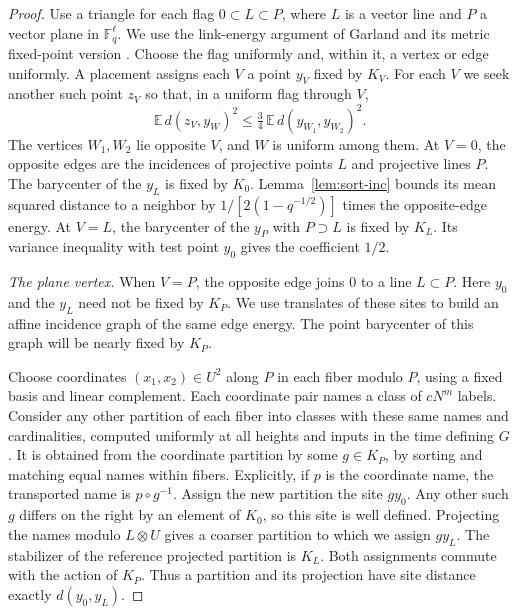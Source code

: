 \begin{proof}
Use a triangle for each flag $0\subset L\subset P$, where $L$ is
a vector line and $P$ a vector plane in $\mathbb F_q^\ell$. We use
the link-energy argument of Garland and its metric fixed-point
version \cite{garland,izekinayatani}. Choose the flag uniformly and,
within it, a vertex or edge uniformly. A placement assigns each $V$
a point $y_V$ fixed by $K_V$. For each $V$ we seek another such point
$z_V$ so that, in a uniform flag through $V$,
\begin{equation}\label{eq:sort-flag-link}
 \mathbb E\,d(z_V,y_W)^2\le \tfrac34\,
                           \mathbb E\,d(y_{W_1},y_{W_2})^2 .
\end{equation}
The vertices $W_1,W_2$ lie opposite $V$, and $W$ is uniform among them.
At $V=0$, the opposite edges are the incidences of projective points
$L$ and projective lines $P$. The barycenter of the $y_L$ is fixed
by $K_0$. Lemma~\ref{lem:sort-inc} bounds its mean squared distance
to a neighbor by $1/[2(1-q^{-1/2})]$ times the opposite-edge energy.
At $V=L$, the barycenter of the $y_P$ with $P\supset L$ is fixed by
$K_L$. Its variance inequality with test point $y_0$ gives the
coefficient $1/2$.

\smallskip\noindent
\emph{The plane vertex.}
When $V=P$, the opposite edge joins $0$ to a line $L\subset P$.
Here $y_0$ and the $y_L$ need not be fixed by $K_P$. We use translates
of these sites to build an affine incidence graph of the same edge
energy. The point barycenter of this graph will be nearly fixed by
$K_P$.

Choose coordinates $(x_1,x_2)\in U^2$ along $P$ in each fiber
modulo $P$, using a fixed basis and linear complement. Each coordinate
pair names a class of $cN^m$ labels. Consider any other partition of
each fiber into classes with these same names and cardinalities,
computed uniformly at all heights and inputs in the time defining
$G$. It is obtained from the coordinate partition by some $g\in K_P$,
by sorting and matching equal names within fibers. Explicitly, if $p$
is the coordinate name, the transported name is $p\circ g^{-1}$.
Assign the new partition the site $g y_0$. Any other such $g$ differs on the right by an element
of $K_0$, so this site is well defined. Projecting the names modulo
$L\otimes U$ gives a coarser partition to which we assign $g y_L$.
The stabilizer of the reference projected partition is $K_L$.
Both assignments commute with
the action of $K_P$. Thus a partition and its projection have site
distance exactly $d(y_0,y_L)$.


\end{proof}
